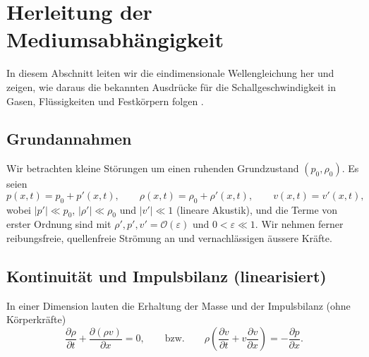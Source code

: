 %
%
%
%
\section{Herleitung der Mediumsabhängigkeit
\label{schall:section:teil1}}


In diesem Abschnitt leiten wir die eindimensionale Wellengleichung her
und zeigen, wie daraus die bekannten Ausdrücke für die Schallgeschwindigkeit
in Gasen, Flüssigkeiten und Festkörpern folgen
\cite{schall:kinsler,schall:landaulifschitz}.

\subsection{Grundannahmen}
Wir betrachten kleine Störungen um einen ruhenden Grundzustand $(p_0,\rho_0)$.
Es seien
\[
    p(x,t)=p_0+p'(x,t),\qquad \rho(x,t)=\rho_0+\rho'(x,t),\qquad v(x,t)=v'(x,t),
\]
wobei $|p'|\ll p_0$, $|\rho'|\ll \rho_0$ und $|v'|\ll 1$ (lineare Akustik),
und die Terme von erster Ordnung sind mit
$\rho',p',v' = \mathcal{O}(\varepsilon) \text{ und } 0<\varepsilon\ll 1$.
Wir nehmen ferner reibungsfreie, quellenfreie Strömung an und
vernachlässigen äussere Kräfte.


\subsection{Kontinuität und Impulsbilanz (linearisiert)}
In einer Dimension lauten die Erhaltung der Masse und der Impulsbilanz
(ohne Körperkräfte)
\begin{equation}
\frac{\partial \rho}{\partial t}+\frac{\partial(\rho v)}{\partial x}=0,
\qquad\text{bzw.}\qquad
\rho\left(\frac{\partial v}{\partial t}+v\frac{\partial v}{\partial x}\right)=-\frac{\partial p}{\partial x}.
\label{eq:exact-cont-mom}
\end{equation}


